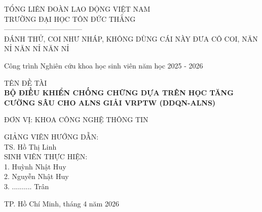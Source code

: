 \documentclass[13pt, a4paper]{extarticle} %
\begin{document}
\begin{titlepage}
    \thispagestyle{empty} %
    \begin{center}
        TỔNG LIÊN ĐOÀN LAO ĐỘNG VIỆT NAM \\
        TRƯỜNG ĐẠI HỌC TÔN ĐỨC THẮNG \\
        --------------------------------- \\
        \vspace{2.5cm}
            ĐÁNH THỬ, COI NHƯ NHÁP, KHÔNG DÙNG CÁI NÀY ĐƯA CÔ COI, NĂN NỈ NĂN NỈ NĂN NỈ
            \vspace{1.5cm}
        
        Công trình Nghiên cứu khoa học sinh viên năm học 2025 - 2026 \\
        \vspace{1.5cm}
        
        TÊN ĐỀ TÀI \\
        \vspace{0.5cm}
        \textbf{\Large BỘ ĐIỀU KHIỂN CHỐNG CHỮNG DỰA TRÊN HỌC TĂNG CƯỜNG SÂU CHO ALNS GIẢI VRPTW (DDQN-ALNS)} \\
        \vspace{1.5cm}
        
        ĐƠN VỊ: KHOA CÔNG NGHỆ THÔNG TIN
        \vspace{2.5cm}
    \end{center}
    
    \begin{flushleft}
        GIẢNG VIÊN HƯỚNG DẪN: \\
        TS. Hồ Thị Linh \\
        \vspace{0.8cm}
        SINH VIÊN THỰC HIỆN: \\
        1. Huỳnh Nhật Huy \\
        2. Nguyễn Nhật Huy \\
        3. .......... Trân

    \end{flushleft}
    
    \vfill
    \begin{center}
        TP. Hồ Chí Minh, tháng 4 năm 2026
    \end{center}
\end{titlepage}

\newpage
\setcounter{page}{1}

\end{document}
